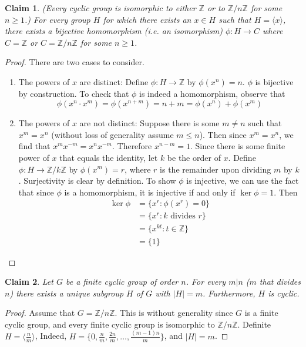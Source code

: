 \documentclass[12pt]{article}
\newtheorem{claim}{Claim}
\theoremstyle{definition}
\theoremstyle{definition}
\newcommand{\Z}{\mathbb{Z}}
\begin{document}
\begin{claim}(Every cyclic group is isomorphic to either $\mathbb{Z}$ or to $\mathbb{Z} / n \mathbb{Z}$ for some $n \geq 1$.) For every group $H$ for which there exists an $x \in H$ such that $H = \langle x \rangle$, there exists a bijective homomorphism (i.e. an isomorphism) $\phi : H \to C$ where $C = \mathbb{Z}$ or $C = \mathbb{Z} / n \mathbb{Z}$ for some $n \geq 1$.
\end{claim}
\begin{proof}
There are two cases to consider. 
\begin{enumerate}
	\item The powers of $x$ are distinct: Define $\phi : H \to \mathbb{Z}$ by $\phi(x^n) = n$. $\phi$ is bijective by construction. To check that $\phi$ is indeed a homomorphism, observe that
	\begin{equation}
		\phi(x^n \cdot x^m) = \phi(x^{n+m}) = n + m = \phi(x^n) + \phi(x^m)
	\end{equation}
	\item The powers of $x$ are not distinct: Suppose there is some $m \neq n$ such that $x^m = x^n$ (without loss of generality assume $m \leq n$). Then since $x^m = x^n$, we find that $x^m x^{-m} = x^n x^{-m}$. Therefore $x^{n-m} = 1$. Since there is some finite power of $x$ that equals the identity, let $k$ be the order of $x$. Define $\phi : H \to \mathbb{Z} / k \mathbb{Z}$ by $\phi(x^m) = r$, where $r$ is the remainder upon dividing $m$ by $k$. Surjectivity is clear by definition. To show $\phi$ is injective, we can use the fact that since $\phi$ is a homomorphism, it is injective if and only if $\ker{\phi} = 1$. Then
	\begin{align*}
		\ker{\phi} &= \{x^r : \phi(x^r) = 0 \} \\
		&= \{x^r : k \text{ divides } r \} \\
		&= \{x^{kt} : t \in \Z \} \\
		&= \{ 1 \} \tag{since $k$ is the order of $x$}
	\end{align*}
\end{enumerate}
\end{proof}

\begin{claim}
Let $G$ be a finite cyclic group of order $n$. For every $m | n$ ($m$ that divides $n$) there exists a unique subgroup $H$ of $G$ with $|H|=m$. Furthermore, $H$ is cyclic.
\end{claim}
\begin{proof}
Assume that $G = \mathbb{Z} / n \mathbb{Z}$. This is without generality since $G$ is a finite cyclic group, and every finite cyclic group is isomorphic to $\mathbb{Z} / n \mathbb{Z}$. Definite $H = \langle \frac{n}{m} \rangle$, Indeed, $H = \{ 0, \frac{n}{m}, \frac{2n}{m}, \ldots, \frac{(m-1)n}{m} \}$, and $|H| = m$. 
\end{proof}
\end{document}
